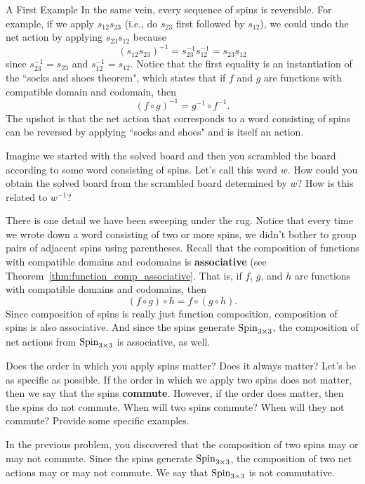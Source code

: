 \begin{section}{A First Example}
In the same vein, every sequence of spins is reversible. For example, if we apply $s_{12} s_{23}$ (i.e., do $s_{23}$ first followed by $s_{12}$), we could undo the net action by applying $s_{23} s_{12}$ because
\[
(s_{12} s_{23})^{-1}=s_{23}^{-1} s_{12}^{-1}=s_{23} s_{12}
\]
since $s_{23}^{-1}=s_{23}$ and $s_{12}^{-1}=s_{12}$.  Notice that the first equality is an instantiation of the ``socks and shoes theorem", which states that if $f$ and $g$ are functions with compatible domain and codomain, then
\[
(f\circ g)^{-1} = g^{-1}\circ f^{-1}.
\]
The upshot is that the net action that corresponds to a word consisting of spins can be reversed by applying ``socks and shoes" and is itself an action.

\begin{problem}
Imagine we started with the solved board and then you scrambled the board according to some word consisting of spins.  Let's call this word $w$. How could you obtain the solved board from the scrambled board determined by $w$? How is this related to $w^{-1}$?
\end{problem}

There is one detail we have been sweeping under the rug.  Notice that every time we wrote down a word consisting of two or more spins, we didn't bother to group pairs of adjacent spins using parentheses.  Recall that the composition of functions with compatible domains and codomains is \textbf{associative} (see Theorem~\ref{thm:function_comp_associative}.  That is, if $f$, $g$, and $h$ are functions with compatible domains and codomains, then
\[
(f\circ g)\circ h = f\circ (g\circ h).
\]
Since composition of spins is really just function composition, composition of spins is also associative.  And since the spins generate $\operatorname{Spin}_{3\times 3}$, the composition of net actions from $\operatorname{Spin}_{3\times 3}$ is associative, as well.

\begin{problem}
Does the order in which you apply spins matter?  Does it always matter?  Let's be as specific as possible.  If the order in which we apply two spins does not matter, then we say that the spins \textbf{commute}.  However, if the order does matter, then the spins do not commute.  When will two spins commute?  When will they not commute?  Provide some specific examples.
\end{problem}

In the previous problem, you discovered that the composition of two spins may or may not commute.  Since the spins generate $\operatorname{Spin}_{3\times 3}$, the composition of two net actions may or may not commute.  We say that $\operatorname{Spin}_{3\times 3}$ is not commutative.


\end{section}
